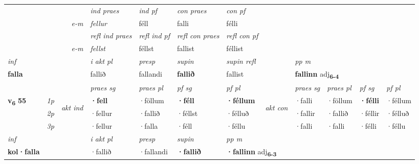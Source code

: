 \begin{longtable}[l]{X>{\footnotesize\itshape}llXXXXlXXXX}
   && &  \textit{ind praes} & \textit{ind pf} & \textit{con praes} & \textit{con pf} \\*
\multicolumn{3}{r}{\textit{e-m}} & fellur & féll & falli & félli \\*

\cmidrule{4-7}
 & && \textit{refl ind praes} & \textit{refl ind pf} & \textit{refl con praes} & \textit{refl con pf} \\*
\multicolumn{3}{r}{\textit{e-m}}& fellst & féllst & fallist & féllist \\*

\cmidrule{4-7}
   {\textit{inf}} & &  & \textit{i akt pl}   & \textit{presp} & \textit{supin} & \textit{supin refl} && \textit{pp m} \\*
  {\textbf{falla}} & &  & fallið   & fallandi &  \textbf{fallið} & fallist && \multicolumn{2}{l}{\textbf{fallinn} adj\textbf{\textsubscript{6-4}}} \\*

\midrule

 & &   & \textit{praes sg}  & \textit{praes pl}    & \textit{ pf sg} & \textit{pf pl} & & \textit{praes sg}  & \textit{praes pl}    & \textit{pf sg} & \textit{pf pl }  \\ \cmidrule{4-7} \cmidrule{9-12}
 \multirow{2}{*}{{{\textbf{v{\textsubscript{6}}} \Large{\textbf{55}}}}}  & 1p & \multirow{3}{*}{\begin{turn}{90}\textit{akt ind}\end{turn}} & \textbf{·fell} & ·föllum & \textbf{·féll} & \textbf{·féllum} & \multirow{3}{*}{\begin{turn}{90}\textit{akt con}\end{turn}} &·falli & ·föllum & \textbf{·félli} & ·féllum\\*
 & 2p &  &  ·fellur  & ·fallið & ·féllst & ·félluð & & ·fallir & ·fallið & ·féllir & ·félluð \\*
 & 3p &  & ·fellur & ·falla & ·féll & ·féllu & & ·falli & ·falli& ·félli & ·féllu \\*
\cmidrule{4-7} \cmidrule{9-12}

   {\textit{inf}} & &  & \textit{i akt pl}   & \textit{presp} & \textit{supin}  & \textit{pp m} \\*
  {\textbf{kol\allowbreak ·falla}} & &  & ·fallið   & ·fallandi &  \textbf{·fallið}  & \multicolumn{2}{l}{\textbf{·fallinn} adj\textbf{\textsubscript{6-3}}} \\*

\midrule


\end{longtable}
